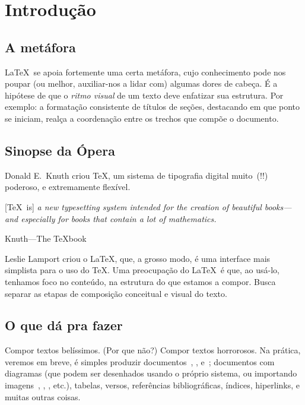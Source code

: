 \section{Introdução}

\subsection{A metáfora}

\LaTeX\ se apoia fortemente uma certa metáfora, cujo conhecimento pode
nos poupar (ou melhor, auxiliar-nos a lidar com) algumas dores de
cabeça. É a hipótese de que o \emph{ritmo visual} de um texto deve
enfatizar sua estrutura. Por exemplo: a formatação consistente de
títulos de seções, destacando em que ponto se iniciam, 
realça a coordenação entre os trechos que compõe o documento.


\subsection{Sinopse da Ópera}

Donald E.~Knuth criou \TeX, um sistema de tipografia digital muito~(!!)
poderoso, e extremamente flexível.

\begin{center}
\begin{minipage}{.75\textwidth}
  [\TeX\ is] \textit{a new typesetting system intended for the creation of
  beautiful books---and especially for books that contain a lot of
  mathematics.}

  \hfill Knuth---The \TeX book
\end{minipage}
\end{center}

  
Leslie Lamport criou o \LaTeX, que, a grosso modo, é uma interface
mais simplista para o uso do \TeX. Uma preocupação do \LaTeX\ é que,
ao usá-lo, tenhamos foco no conteúdo, na estrutura do que estamos a
compor. Busca separar as etapas de composição conceitual e visual do
texto.%

\subsection{O que dá pra fazer}

Compor textos belíssimos. (Por que não?) Compor textos horrorosos. Na
prática, veremos em breve, é simples produzir
documentos~, , e~; documentos
com diagramas (que podem ser desenhados usando o próprio sistema, ou
importando imagens~, , ,
etc.), tabelas, versos, referências bibliográficas, índices,
hiperlinks, e muitas outras coisas.

